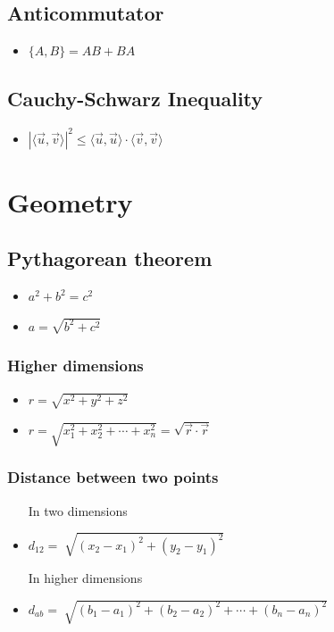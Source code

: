 \documentclass[]{report}
\newcommand \tab[1][1cm]{\hspace*{#1}}
\newcommand{\itemt}{\item \tab}
\begin{document}
\subsection{Anticommutator}
\begin{itemize}
\itemt \( \{A,B\} = AB + BA \)
\end{itemize}			


\subsection{Cauchy-Schwarz Inequality}
\begin{itemize}
\itemt \( |\langle \vec{u},\vec{v} \rangle|^2 \leq \langle \vec{u},\vec{u} \rangle \cdot \langle \vec{v},\vec{v} \rangle \)
\end{itemize}



	\section{Geometry}


		\subsection{Pythagorean theorem}
\begin{itemize}
\itemt \( a^2 + b^2 = c^2 \)
\itemt \( a = \sqrt{b^2 + c^2} \)
\end{itemize}

\subsubsection{Higher dimensions}
\begin{itemize}
\itemt \( r = \sqrt{x^2 + y^2 +z^2} \)
\itemt \( r = \sqrt{x_1^2 + x_2^2 + \cdots + x_n^2} = \sqrt{\vec{r}\cdot\vec{r}} \)
\end{itemize}

\subsubsection{Distance between two points}
\begin{itemize}
\item[In two dimensions]
\itemt \( d_{12} = \sqrt[]{(x_2-x_1)^2 + (y_2-y_1)^2} \)
\item[In higher dimensions]
\itemt \( d_{ab} = \sqrt[]{(b_1-a_1)^2 + (b_2-a_2)^2 + \cdots + (b_n - a_n)^2} \)
\end{itemize}
            
\end{document}

